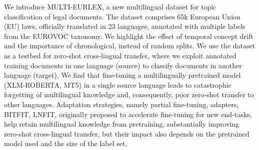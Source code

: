 We introduce MULTI-EURLEX, a new multilingual dataset for topic classification of legal documents. The dataset comprises 65k European Union (EU) laws, officially translated in 23 languages, annotated with multiple labels from the EUROVOC taxonomy. We highlight the effect of temporal concept drift and the importance of chronological, instead of random splits. We use the dataset as a testbed for zero-shot cross-lingual transfer, where we exploit annotated training documents in one language (source) to classify documents in another language (target). We find that fine-tuning a multilingually pretrained model (XLM-ROBERTA, MT5) in a single source language leads to catastrophic forgetting of multilingual knowledge and, consequently, poor zero-shot transfer to other languages. Adaptation strategies, namely partial fine-tuning, adapters, BITFIT, LNFIT, originally proposed to accelerate fine-tuning for new end-tasks, help retain multilingual knowledge from pretraining, substantially improving zero-shot cross-lingual transfer, but their impact also depends on the pretrained model used and the size of the label set.
